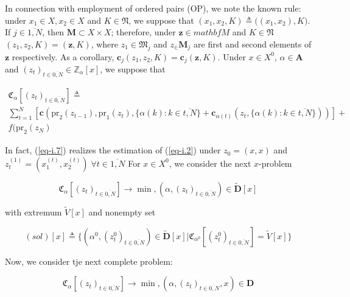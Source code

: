 \documentclass{article}
\begin{document}
In connection with employment of ordered pairs
(OP),
we note the known rule:
under
$x_1 \in X, x_2 \in X$
and
$K \in \mathfrak N$,
we suppose that
$(x_1, x_2, K) \triangleq \big( (x_1, x_2), K\big)$.
If
$j \in \overline{1,N}$,
then
$\mathbf M \subset X \times X$;
therefore, under
$\mathbf z \in mathbf M$
and
$K \in \mathfrak N$
$(z_1,z_2, K)=(\mathbf z, K)$,
where
$z_1 \in \mathfrak M_j$
and
$z_ \in \mathbf M_j$
are first and second elements of
$\mathbf z$
respectively.
As a corollary,
$\mathbf c_j(z_1, z_2, K) = \mathbf c_j(\mathbf z, K)$.
Under
$x \in X^0$,
$\alpha \in \mathbf A$
and
$(z_t)_{t \in \overline{0,N}} \in \mathbb Z_\alpha[x]$,
we suppose that

\begin{multline}
  \label{eq-i.7}
  \mathfrak C_\alpha[(z_t)_{t \in \overline{0,N}}]
  \triangleq \\
  \sum_{t=1}^N
  [
    \mathbf c(
      \mathrm{pr}_2(z_{t-1}),
      \mathrm{pr}_1(z_t),
      \{ \alpha(k) : k \in \overline{t, N} \}
      +
      \mathbf c_{\alpha(t)}(z_t, \{ \alpha(k) : k \in \overline{t,N}\})
      )
  ]
  + \\
  f(\mathrm{pr}_2(z_N)
\end{multline}

In fact,
(\ref{eq-i.7})
realizes the estimation of (\ref{eq-i.2})
under
$z_0 = (x,x)$
and
$z_t^{(1)} =(x_1^{(t)}, x_2^{(t)})
\;
\forall t \in \overline{1, N}$
For
$x \in X^0$,
we consider the next
$x$-problem

\begin{equation}
  \label{eq-i.8}
  \mathfrak C_\alpha[(z_t)_{t \in \overline{0,N}}]
  \to \min,
  (\alpha, (z_t)_{t \in \overline{0,N}}) \in \tilde{\mathbf D}[x]
\end{equation}

with extremum
$\tilde{V}[x]$
and nonempty set

\begin{equation}
  \label{eq-i.9}
  (sol)[x]
  \triangleq
  \{
    (\alpha^0, (z_t^0)_{t \in \overline{0,N}}) \in \tilde{\mathbf D}[x]
  |
    \mathfrak C_{\alpha^0}[(z_t^0)_{t \in \overline{0,N}}] = \tilde{V}[x]
  \}
\end{equation}

Now, we consider tje next complete problem:

\begin{equation}
  \label{eq-i.10}
  \mathfrak C_\alpha[(z_t)_{t \in \overline{0,N}}]
  \to \min,
  (\alpha, (z_t)_{t \in \overline{0,N}}, x) \in \mathbf D
\end{equation}
\end{document}
